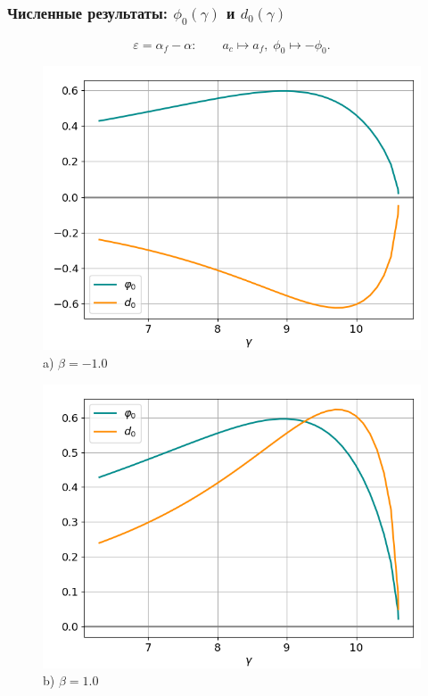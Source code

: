 \documentclass[fullscreen=true, unicode, bookmarks=false]{beamer}
\begin{document}
\begin{frame}
\frametitle{ Численные результаты: $ \phi_0(\gamma) $ и $ d_0(\gamma) $ }

$$ \varepsilon = \alpha_f - \alpha: \qquad a_c \longmapsto a_f, \; \phi_0 \longmapsto -\phi_0. $$

\vfill

\begin{figure} 
\begin{minipage}[h]{0.49\linewidth}
\begin{center}
\includegraphics[scale=0.33]{oscillating_phi0d0_after_tangent_x0_045_beta_-1.png} \\ {\scriptsize a) $ \beta = -1.0 $}
\end{center}
\end{minipage} 
\hfill
\begin{minipage}[h]{0.49\linewidth}
\begin{center}
\includegraphics[scale=0.33]{oscillating_phi0d0_after_tangent_x0_045_beta_1.png}  \\ {\scriptsize b) $ \beta = 1.0 $}
\end{center}
\end{minipage} 
\end{figure}


\end{frame}
\end{document}

